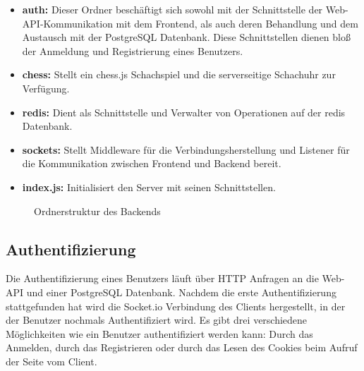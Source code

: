 \begin{itemize}
\item \textbf{auth:} Dieser Ordner beschäftigt sich sowohl mit der Schnittstelle der Web-API-Kommunikation mit dem Frontend, als auch deren Behandlung und dem Austausch mit der PostgreSQL Datenbank. Diese Schnittstellen dienen bloß der Anmeldung und Registrierung eines Benutzers.
\item \textbf{chess:} Stellt ein chess.js Schachspiel und die serverseitige Schachuhr zur Verfügung.
\item \textbf{redis:} Dient als Schnittstelle und Verwalter von Operationen auf der redis Datenbank.
\item \textbf{sockets:} Stellt Middleware für die Verbindungsherstellung und Listener für die Kommunikation zwischen Frontend und Backend bereit.
\item \textbf{index.js:} Initialisiert den Server mit seinen Schnittstellen.
\end{itemize}

\begin{figure}[h]
\centering

\begin{minipage}{0.5\textwidth}
\end{minipage}
\caption{Ordnerstruktur des Backends}
\label{fig:backend_dirtree}

\end{figure}


\subsection{Authentifizierung}
\label{sec:Authentifizierung Backend}
Die Authentifizierung eines Benutzers läuft über HTTP Anfragen an die Web-API und einer PostgreSQL Datenbank.
Nachdem die erste Authentifizierung stattgefunden hat wird die Socket.io Verbindung des Clients hergestellt, in der der Benutzer nochmals Authentifiziert wird.
Es gibt drei verschiedene Möglichkeiten wie ein Benutzer authentifiziert werden kann: Durch das Anmelden, durch das Registrieren oder durch das Lesen des Cookies beim Aufruf der Seite vom Client.

